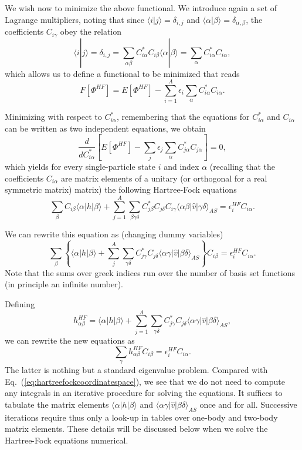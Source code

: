 \documentclass[%
twoside,                 %
final,                   %
10pt]{article}
\begin{document}
We wish now to minimize the above functional. We introduce again a set of Lagrange multipliers, noting that
since $\langle i | j \rangle = \delta_{i,j}$ and $\langle \alpha | \beta \rangle = \delta_{\alpha,\beta}$, 
the coefficients $C_{i\gamma}$ obey the relation
\[
 \langle i | j \rangle=\delta_{i,j}=\sum_{\alpha\beta} C^*_{i\alpha}C_{i\beta}\langle \alpha | \beta \rangle=
\sum_{\alpha} C^*_{i\alpha}C_{i\alpha},
\]
which allows us to define a functional to be minimized that reads
\begin{equation}
  F[\Phi^{HF}]=E[\Phi^{HF}] - \sum_{i=1}^A\epsilon_i\sum_{\alpha} C^*_{i\alpha}C_{i\alpha}.
\end{equation}







Minimizing with respect to $C^*_{i\alpha}$, remembering that the equations for $C^*_{i\alpha}$ and $C_{i\alpha}$
can be written as two  independent equations, we obtain
\[
\frac{d}{dC^*_{i\alpha}}\left[  E[\Phi^{HF}] - \sum_{j}\epsilon_j\sum_{\alpha} C^*_{j\alpha}C_{j\alpha}\right]=0,
\]
which yields for every single-particle state $i$ and index $\alpha$ (recalling that the coefficients $C_{i\alpha}$ are matrix elements of a unitary (or orthogonal for a real symmetric matrix) matrix)
the following Hartree-Fock equations
\[
\sum_{\beta} C_{i\beta}\langle \alpha | h | \beta \rangle+
\sum_{j=1}^A\sum_{\beta\gamma\delta} C^*_{j\beta}C_{j\delta}C_{i\gamma}\langle \alpha\beta|\hat{v}|\gamma\delta\rangle_{AS}=\epsilon_i^{HF}C_{i\alpha}.
\]





We can rewrite this equation as (changing dummy variables)
\[
\sum_{\beta} \left\{\langle \alpha | h | \beta \rangle+
\sum_{j}^A\sum_{\gamma\delta} C^*_{j\gamma}C_{j\delta}\langle \alpha\gamma|\hat{v}|\beta\delta\rangle_{AS}\right\}C_{i\beta}=\epsilon_i^{HF}C_{i\alpha}.
\]
Note that the sums over greek indices run over the number of basis set functions (in principle an infinite number).





Defining 
\[
h_{\alpha\beta}^{HF}=\langle \alpha | h | \beta \rangle+
\sum_{j=1}^A\sum_{\gamma\delta} C^*_{j\gamma}C_{j\delta}\langle \alpha\gamma|\hat{v}|\beta\delta\rangle_{AS},
\]
we can rewrite the new equations as 
\begin{equation}
\sum_{\gamma}h_{\alpha\beta}^{HF}C_{i\beta}=\epsilon_i^{HF}C_{i\alpha}. \label{eq:newhf}
\end{equation}
The latter is nothing but a standard eigenvalue problem. Compared with Eq.~(\ref{eq:hartreefockcoordinatespace}),
we see that we do not need to compute any integrals in an iterative procedure for solving the equations.
It suffices to tabulate the matrix elements $\langle \alpha | h | \beta \rangle$ and $\langle \alpha\gamma|\hat{v}|\beta\delta\rangle_{AS}$ once and for all. Successive iterations require thus only a look-up in tables over one-body and two-body matrix elements. These details will be discussed below when we solve the Hartree-Fock equations numerical. 
\end{document}
